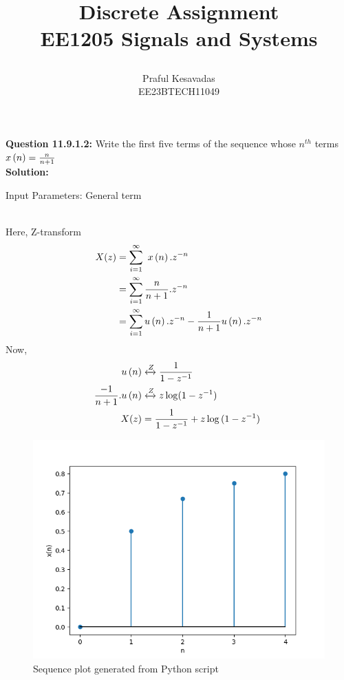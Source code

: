 \documentclass{article}
\begin{document}
\title{
\Huge\textbf{Discrete Assignment}\\
\Huge\textbf{EE1205} Signals and Systems\\
\date{}
}
\large\author{Praful Kesavadas\\EE23BTECH11049}
\maketitle

\textbf{Question 11.9.1.2:}
Write the first five terms of the sequence whose $n^{th}$ terms  $x\left(n\right) = \frac{n}{n+1}$\\
\textbf{Solution:}
\begin{table}[ht]
  \centering
  
  \caption{Input Parameters: General term}
\end{table}\\
Here, Z-transform
\begin{align}
X(z) &= \sum_{i=1}^\infty\ x\left(n\right).z^{-n}\\
&= \sum_{i=1}^\infty \frac{n}{n+1} . z^{-n}\\
&= \sum_{i=1}^\infty u\left(n\right).z^{-n} - \frac{1}{n+1} u\left(n\right).z^{-n}
\end{align}
Now, 
\begin{align}
u\left(n\right) &\xleftrightarrow Z  \frac{1}{1-z^{-1}}\\
\frac{-1}{n+1}.u\left(n\right) &\xleftrightarrow Z  z\log(1-z^{-1})\\
X(z) &= \frac{1}{1-z^{-1}} + z\log{(1-z^{-1})}\
\end{align}
\begin{figure}[h]
    \centering
    \includegraphics[width=\columnwidth]{figs/graph1.png}
    \caption{Sequence plot generated from Python script}
    \label{fig:sequence-plot}
\end{figure}
\end{document}

